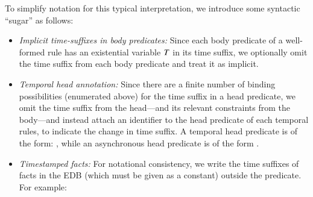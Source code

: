 To simplify \lang notation for this typical interpretation, we
introduce some syntactic ``sugar'' as follows:

\begin{itemize}
%
%
\item {\em Implicit time-suffixes in body predicates:} Since each body
predicate of a well-formed rule has an existential variable $\DT$ in its
time suffix, we optionally omit the time suffix from each body predicate and treat
it as implicit.
%
\item {\em Temporal head annotation:} Since there are a finite number of binding
possibilities (enumerated above) for the time suffix in a head predicate, we omit the time
suffix from the head---and its relevant constraints from the body---and
instead attach an identifier to the head predicate of each temporal rules, to indicate the change in
time suffix.  A temporal head predicate  is of the form: ,
while an asynchronous head predicate  is of the form .

\item {\em Timestamped facts:} For notational consistency, we write the time suffixes of facts in the EDB (which
must be given as a constant) outside the predicate.  For example:


%
%
%
%
%
\end{itemize}

